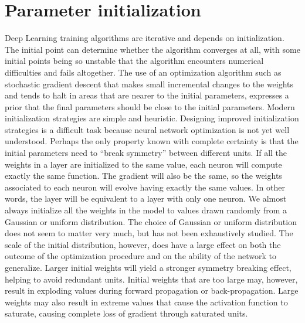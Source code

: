 \section{Parameter initialization}
Deep Learning training algorithms are iterative and depends on initialization. The initial point can determine whether the algorithm converges at all, with some initial points being so unstable that the algorithm encounters numerical difficulties and fails altogether. The use of an optimization algorithm such as stochastic gradient descent that makes small incremental changes to the weights and tends to halt in areas that are nearer to the initial parameters, expresses a
prior that the final parameters should be close to the initial parameters.\newline\newline
Modern initialization strategies are simple and heuristic. Designing improved
initialization strategies is a difficult task because neural network optimization is not yet well understood. Perhaps the only property known with complete certainty is that the initial parameters need to “break symmetry” between different units.\newline\newline
If all the weights in a layer are initialized to the same value, each neuron will compute exactly the same function. The gradient will also be the same, so the weights associated to each neuron will evolve having exactly the same values. In other words, the layer will be equivalent to a layer with only one neuron.\newline\newline
We almost always initialize all the weights in the model to values drawn randomly from a Gaussian or uniform distribution. The choice of Gaussian or uniform distribution does not seem to matter very much, but has not been exhaustively studied. The scale of the initial distribution, however, does have a large effect on both the outcome of the optimization procedure and on the ability of the network to generalize.\newline\newline
Larger initial weights will yield a stronger symmetry breaking effect, helping to avoid redundant units. Initial weights that are
too large may, however, result in exploding values during forward propagation or back-propagation. Large weights may also result in extreme values that cause the activation function to saturate, causing complete loss of gradient through saturated units.\newline\newline
